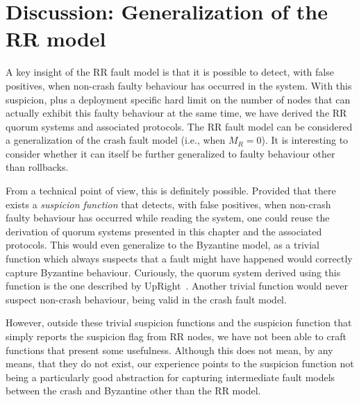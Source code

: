 \section{Discussion: Generalization of the \ac{RR} model}\label{sec:discussion}

A key insight of the \ac{RR} fault model is that it is possible
to detect, with false positives, when non-crash faulty behaviour
has occurred in the system. With this suspicion, plus a deployment
specific hard limit on the number of nodes that can actually
exhibit this faulty behaviour at the same time, we have derived
the \ac{RR} quorum systems and associated protocols. The \ac{RR}
fault model can be considered a generalization of the crash fault
model (i.e., when $M_R = 0$). It is interesting to consider
whether it can itself be further generalized to faulty behaviour
other than rollbacks.

From a technical point of view, this is definitely possible.
Provided that there exists a \emph{suspicion function} that
detects, with false positives, when non-crash faulty behaviour
has occurred while reading the system, one could reuse the derivation
of quorum systems presented in this chapter and the associated
protocols. This would even generalize to the Byzantine model, as a
trivial function which always suspects that a fault
might have happened would correctly capture Byzantine behaviour.
Curiously, the quorum system derived using this function is the
one described by UpRight~\cite{upright}. Another trivial function
would never suspect non-crash behaviour, being valid in the crash
fault model.

However, outside these trivial suspicion functions and the
suspicion function that simply reports the suspicion flag from
\ac{RR} nodes, we have not been able to craft functions that
present some usefulness. Although this does not mean, by any
means, that they do not exist, our experience points to the
suspicion function not being a particularly good abstraction for capturing
intermediate fault models between the crash and Byzantine other
than the \ac{RR} model.
